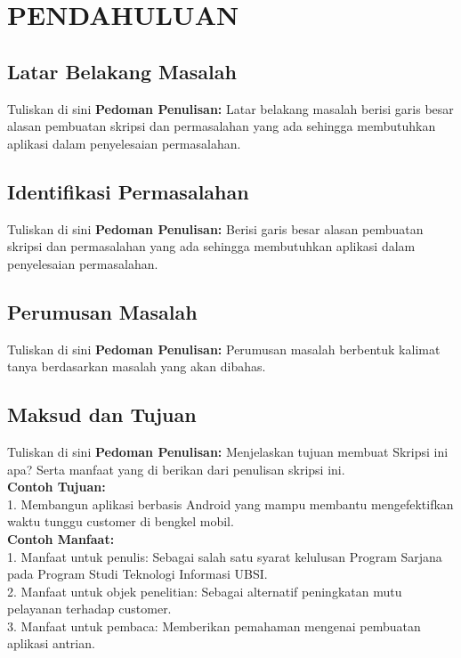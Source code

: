 \chapter{PENDAHULUAN}
\section{Latar Belakang Masalah}


Tuliskan di sini \textbf{Pedoman Penulisan:} Latar belakang masalah berisi garis besar alasan pembuatan skripsi dan permasalahan yang ada sehingga membutuhkan aplikasi dalam penyelesaian permasalahan.



\section{Identifikasi Permasalahan}


Tuliskan di sini \textbf{Pedoman Penulisan:} Berisi garis besar alasan pembuatan skripsi dan permasalahan yang ada sehingga membutuhkan aplikasi dalam penyelesaian permasalahan.



\section{Perumusan Masalah}


Tuliskan di sini \textbf{Pedoman Penulisan:} Perumusan masalah berbentuk kalimat tanya berdasarkan masalah yang akan dibahas.



\section{Maksud dan Tujuan}


Tuliskan di sini \textbf{Pedoman Penulisan:} Menjelaskan tujuan membuat Skripsi ini apa? Serta manfaat yang di berikan dari penulisan skripsi ini.\\
\textbf{Contoh Tujuan:}\\
1. Membangun aplikasi berbasis Android yang mampu membantu mengefektifkan waktu tunggu customer di bengkel mobil.\\
\textbf{Contoh Manfaat:}\\
1. Manfaat untuk penulis: Sebagai salah satu syarat kelulusan Program Sarjana pada Program Studi Teknologi Informasi UBSI.\\
2. Manfaat untuk objek penelitian: Sebagai alternatif peningkatan mutu pelayanan terhadap customer.\\
3. Manfaat untuk pembaca: Memberikan pemahaman mengenai pembuatan aplikasi antrian.




